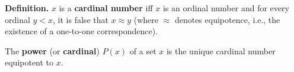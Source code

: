 \textbf{Definition.} $x$ is a \textbf{cardinal number} iff $x$ is an ordinal number and for every ordinal $y < x$, it is false that $x \approx y$ (where $\approx$ denotes equipotence, i.e., the existence of a one-to-one correspondence).

The \textbf{power} (or \textbf{cardinal}) $P(x)$ of a set $x$ is the unique cardinal number equipotent to $x$.
